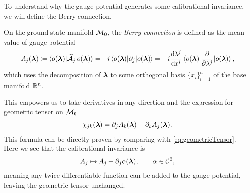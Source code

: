 To understand why the gauge potential generates some calibrational invariance, we will define the Berry connection.
\begin{definition}    
    On the ground state manifold $\mathcal{M}_0$, the \emph{Berry connection} is defined as the mean value of gauge potential
    \begin{equation}
        A_j({\bm\lambda})\coloneqq \braket{o({\bm\lambda})|\mathcal{\widehat{A}}_j|o({\bm\lambda})}= -i \braket{o({\bm\lambda})|\partial_j|o({\bm\lambda})}= -i\frac{\mathrm{d} \lambda^j}{\mathrm{d} x^i} \braket{o({\bm\lambda})|\frac{\partial }{\partial \lambda^j}|o({\bm\lambda})},
        \label{eq:berryConnection}
    \end{equation}
    which uses the decomposition of ${\bm\lambda}$ to some orthogonal basis $\{x_i\}_{i=1}^n$ of the base manifold $\mathbb{R}^n$. 
\end{definition}
    

This empowers us to take derivatives in any direction and the expression for geometric tensor on $\mathcal{M}_0$
\begin{equation}
    \chi_{jk}({\bm\lambda}) = \partial_j A_k({\bm\lambda})-\partial_k A_j({\bm\lambda})
    \label{eq:geometricTensor}.
\end{equation}
This formula can be directly proven by comparing with \ref{eq:geometricTensor}. Here we see that the calibrational invariance is 
\begin{equation}
    A_j \mapsto A_j+\partial_j \alpha({\bm\lambda}),\qquad \alpha\in\mathcal C^2,
\end{equation}
meaning any twice differentiable function can be added to the gauge potential, leaving the geometric tensor unchanged.


